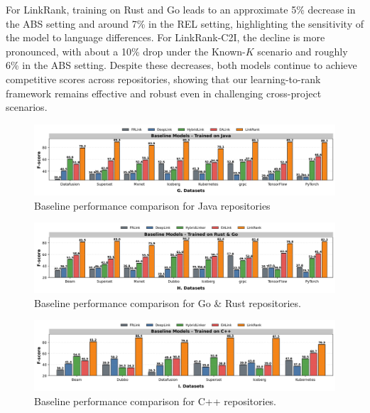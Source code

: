 For LinkRank, training on Rust and Go leads to an approximate 5\% decrease in the ABS setting and around 7\% in the REL setting, highlighting the sensitivity of the model to language differences. For LinkRank-C2I, the decline is more pronounced, with about a 10\% drop under the Known-$K$ scenario and roughly 6\% in the ABS setting.  Despite these decreases, both models continue to achieve competitive scores across repositories, showing that our learning-to-rank framework remains effective and robust even in challenging cross-project scenarios.


\begin{figure}[H]
  \centering
  \includegraphics[width=\linewidth]{Figures/baseline_java.png}
  \caption{Baseline performance comparison for Java repositories}
  \label{fig:baseline_java}
\end{figure}

\begin{figure}[H]
  \centering
  \includegraphics[width=\linewidth]{Figures/baseline_rust_go.png}
  \caption{Baseline performance comparison for Go \& Rust repositories.}
  \label{fig:baseline_rust_go}
\end{figure}

\begin{figure}[H]
  \centering
  \includegraphics[width=\linewidth]{Figures/baseline_cpp.png}
  \caption{Baseline performance comparison for C++ repositories.}
  \label{fig:baseline_cpp}
\end{figure}

